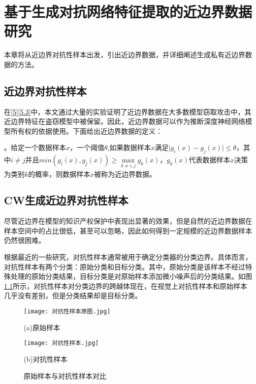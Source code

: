 
\chapter{基于生成对抗网络特征提取的近边界数据研究}\label{3}

本章将从近边界对抗性样本出发，引出近边界数据，并详细阐述生成私有近边界数据的方法。

\section{近边界对抗性样本}

在\ref{5}\ref{5.3}中，本文通过大量的实验证明了近边界数据在大多数模型窃取攻击中，其近边界特征在盗窃模型中被保留。因此，近边界数据可以作为推断深度神经网络模型所有权的依据使用。下面给出近边界数据的定义：

\begin{myDef}
	\label{def:1}
	。给定一个数据样本$x$，一个阈值$\theta$,如果数据样本$x$满足$\vert g_i(x) - g_j(x) \vert \leq \theta$，其中$i \neq j $并且$min(g_i(x), g_j(x)) \geq \mathop{max} \limits_{k \neq i, j}g_k(x)$，$g_k(x)$代表数据样本$x$决策为类别$k$的概率，则数据样本$x$被称为近边界数据。
\end{myDef}


\section{CW生成近边界对抗性样本}\label{3.2}

尽管近边界在模型的知识产权保护中表现出显著的效果，但是自然的近边界数据在样本空间中的占比很低，甚至可以忽略，因此如何得到一定规模的近边界数据样本仍然很困难。

根据最近的一些研究\cite{cao2021ipguard}，对抗性样本通常被用于确定分类器的分类边界。具体而言，对抗性样本有两个分类：原始分类和目标分类。其中，原始分类是该样本不经过特殊处理的原始分类结果，目标分类是对原始样本添加微小噪声后的分类结果。如图\ref{原始样本与对抗性样本对比}所示，对抗性样本对分类边界的跨越体现在，在视觉上对抗性样本和原始样本几乎没有差别，但是分类结果却是目标分类。

\begin{figure}[htbp]%
	\begin{minipage}[t]{0.5\linewidth}        %
		\hspace{2mm}
		\centering
		\texttt{[image: 对抗性样本原图.jpg]}
		\centerline{(a)原始样本}
	\end{minipage}
	\begin{minipage}[t]{0.5\linewidth}        %
		\hspace{2mm}
		\centering
		\texttt{[image: 对抗性样本.jpg]}
		\centerline{(b)对抗性样本}
	\end{minipage}
\setlength{\abovecaptionskip}{7mm} %
\caption{原始样本与对抗性样本对比}
\label{原始样本与对抗性样本对比}
\end {figure}

